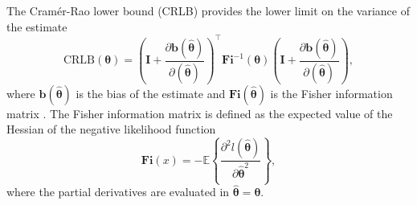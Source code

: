 The Cram\'er-Rao lower bound (CRLB) provides the lower limit on the variance of the estimate
\begin{equation} \mathrm{CRLB}(\bm{\theta}) = \left( \mathbf{I} + \frac{\partial \mathbf{b} (\widehat{\bm{\theta}}) }{\partial (\widehat{\bm{\theta}})} \right)^\top \mathbf{Fi}^{-1}(\bm{\theta}) \left( \mathbf{I} + \frac{\partial \mathbf{b} (\widehat{\bm{\theta}}) }{\partial (\widehat{\bm{\theta}})} \right), \label{eqn:CRLB} \end{equation}
where $\mathbf{b} (\widehat{\bm{\theta}})$ is the bias of the estimate and $\mathbf{Fi}(\widehat{\bm{\theta}})$ is the Fisher information matrix \citep{Pintelon12Book}.
The Fisher information matrix is defined as the expected value of the Hessian of the negative likelihood function 
\begin{equation} \mathbf{Fi}(x) = - \mathbb{E} \left\{ \frac{\partial ^2 l (\widehat{\bm{\theta}}) }{\partial \widehat{\bm{\theta}}^2 } \right\}, \end{equation}
where the partial derivatives are evaluated in $\widehat{\bm{\theta}} = \bm{\theta}$.

